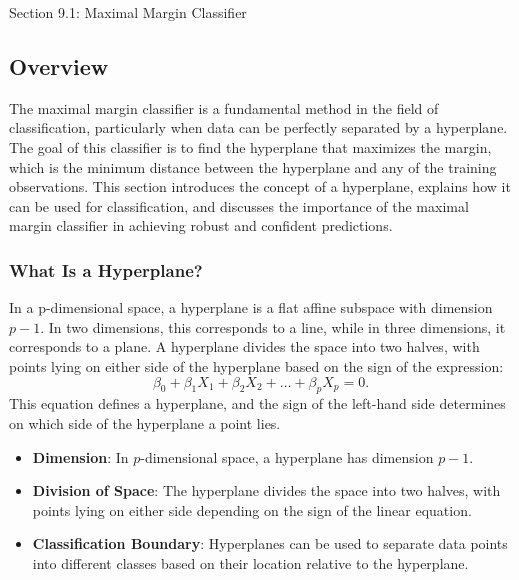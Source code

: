 \begin{notes}{Section 9.1: Maximal Margin Classifier}
    \subsection*{Overview}

    The maximal margin classifier is a fundamental method in the field of classification, particularly when data can be perfectly separated by a hyperplane. The goal of this classifier is to find the hyperplane 
    that maximizes the margin, which is the minimum distance between the hyperplane and any of the training observations. This section introduces the concept of a hyperplane, explains how it can be used for 
    classification, and discusses the importance of the maximal margin classifier in achieving robust and confident predictions.
    
    \subsubsection*{What Is a Hyperplane?}
    
    In a p-dimensional space, a hyperplane is a flat affine subspace with dimension $p-1$. In two dimensions, this corresponds to a line, while in three dimensions, it corresponds to a plane. A hyperplane 
    divides the space into two halves, with points lying on either side of the hyperplane based on the sign of the expression:
    \[
    \beta_0 + \beta_1 X_1 + \beta_2 X_2 + \dots + \beta_p X_p = 0.
    \]
    This equation defines a hyperplane, and the sign of the left-hand side determines on which side of the hyperplane a point lies.
    
    \begin{highlight}
        \begin{itemize}
            \item \textbf{Dimension}: In $p$-dimensional space, a hyperplane has dimension $p-1$.
            \item \textbf{Division of Space}: The hyperplane divides the space into two halves, with points lying on either side depending on the sign of the linear equation.
            \item \textbf{Classification Boundary}: Hyperplanes can be used to separate data points into different classes based on their location relative to the hyperplane.
        \end{itemize}
    \end{highlight}
    

\end{notes}

